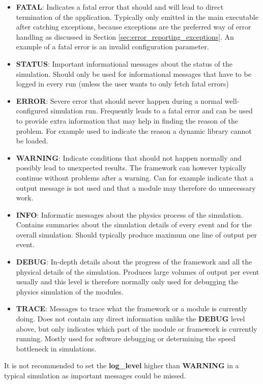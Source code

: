 \begin{itemize}
\item \textbf{FATAL}: Indicates a fatal error that should and will lead to direct termination of the application. Typically only emitted in the main executable after catching exceptions, because exceptions are the preferred way of error handling as discussed in Section \ref{sec:error_reporting_exceptions}. An example of a fatal error is an invalid configuration parameter.
\item \textbf{STATUS}: Important informational messages about the status of the simulation. Should only be used for informational messages that have to be logged in every run (unless the user wants to only fetch fatal errors)
\item \textbf{ERROR}: Severe error that should never happen during a normal well-configured simulation run. Frequently leads to a fatal error and can be used to provide extra information that may help in finding the reason of the problem. For example used to indicate the reason a dynamic library cannot be loaded.
\item \textbf{WARNING}: Indicate conditions that should not happen normally and possibly lead to unexpected results. The framework can however typically continue without problems after a warning. Can for example indicate that a output message is not used and that a module may therefore do unnecessary work.
\item \textbf{INFO}: Informatic messages about the physics process of the simulation. Contains summaries about the simulation details of every event and for the overall simulation. Should typically produce maximum one line of output per event.
\item \textbf{DEBUG}: In-depth details about the progress of the framework and all the physical details of the simulation. Produces large volumes of output per event usually and this level is therefore normally only used for  debugging the physics simulation of the modules.
\item \textbf{TRACE}: Messages to trace what the framework or a module is currently doing. Does not contain any direct information unlike the \textbf{DEBUG} level above, but only indicates which part of the module or framework is currently running. Mostly used for software debugging or determining the speed bottleneck in simulations.
\end{itemize}
It is not recommended to set the \textbf{log\_level} higher than \textbf{WARNING} in a typical simulation as important messages could be missed.


